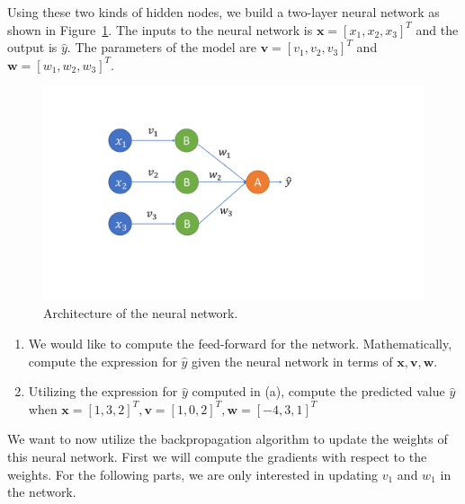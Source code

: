 Using these two kinds of hidden nodes, we build a two-layer neural network as shown in Figure~\ref{fig:nn-network}. The inputs to the neural network is $\mathbf{x} = [x_1, x_2, x_3]^T$ and the output is $\hat{y}$. The parameters of the model are $\mathbf{v} = [v_1, v_2, v_3]^T$ and $\mathbf{w} = [w_1, w_2, w_3]^T$.

\begin{figure}[h]
    \centering
    \includegraphics[width=.5\linewidth]{hw2-images/neural-network.pdf}
    \caption{Architecture of the neural network.}
    \label{fig:nn-network}
\end{figure}

\begin{enumerate}
    \item {}
    We would like to compute the feed-forward for the network. Mathematically, compute the expression for $\hat{y}$ given the neural network in terms of $\mathbf{x}, \mathbf{v}, \mathbf{w}$.
    
    
    
    \item {}
    Utilizing the expression for $\hat{y}$ computed in (a), compute the predicted value $\hat{y}$ when $\mathbf{x} = [1,3,2]^T, \mathbf{v}=[1,0,2]^T, \mathbf{w}=[-4,3,1]^T$
    
    
\end{enumerate}

We want to now utilize the backpropagation algorithm to update the weights of this neural network. First we will compute the gradients with respect to the weights. For the following parts, we are only interested in updating $v_1$ and $w_1$ in the network.

